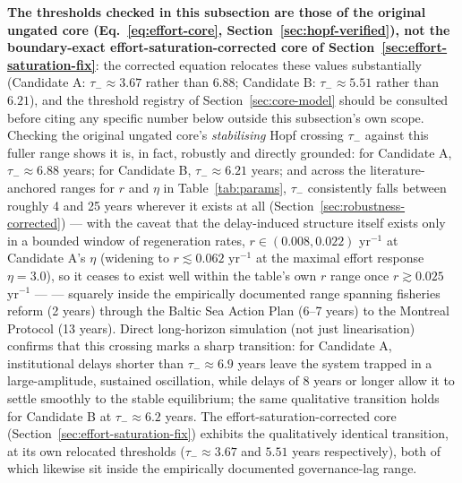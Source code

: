 \documentclass[twocolumn,10pt]{article}
\begin{document}
\textbf{The thresholds checked in this subsection are those of the original ungated core (Eq.~\eqref{eq:effort-core}, Section~\ref{sec:hopf-verified}), not the boundary-exact effort-saturation-corrected core of Section~\ref{sec:effort-saturation-fix}}: the corrected equation relocates these values substantially (Candidate A: $\tau_-\approx3.67$ rather than $6.88$; Candidate B: $\tau_-\approx5.51$ rather than $6.21$), and the threshold registry of Section~\ref{sec:core-model} should be consulted before citing any specific number below outside this subsection's own scope. Checking the original ungated core's \emph{stabilising} Hopf crossing $\tau_-$ against this fuller range shows it is, in fact, robustly and directly grounded: for Candidate A, $\tau_-\approx6.88$ years; for Candidate B, $\tau_-\approx6.21$ years; and across the literature-anchored ranges for $r$ and $\eta$ in Table~\ref{tab:params}, $\tau_-$ consistently falls between roughly 4 and 25 years wherever it exists at all (Section~\ref{sec:robustness-corrected}) --- with the caveat that the delay-induced structure itself exists only in a bounded window of regeneration rates, $r\in(0.008,0.022)$ yr$^{-1}$ at Candidate A's $\eta$ (widening to $r\lesssim0.062$ yr$^{-1}$ at the maximal effort response $\eta=3.0$), so it ceases to exist well within the table's own $r$ range once $r\gtrsim0.025$ yr$^{-1}$ --- — squarely inside the empirically documented range spanning fisheries reform (2 years) through the Baltic Sea Action Plan (6--7 years) to the Montreal Protocol (13 years). Direct long-horizon simulation (not just linearisation) confirms that this crossing marks a sharp transition: for Candidate A, institutional delays shorter than $\tau_-\approx6.9$ years leave the system trapped in a large-amplitude, sustained oscillation, while delays of 8 years or longer allow it to settle smoothly to the stable equilibrium; the same qualitative transition holds for Candidate B at $\tau_-\approx6.2$ years. The effort-saturation-corrected core (Section~\ref{sec:effort-saturation-fix}) exhibits the qualitatively identical transition, at its own relocated thresholds ($\tau_-\approx3.67$ and $5.51$ years respectively), both of which likewise sit inside the empirically documented governance-lag range.
\end{document}
